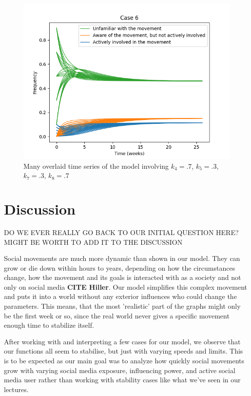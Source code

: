 \documentclass{article}
\begin{document}
    \begin{figure}[H]

        \centering
        \includegraphics[width=\textwidth]{simulation/plots/case6.png}   
        \caption{Many overlaid time series of the model involving \mbox{$k_4=.7$}, \mbox{$k_5=.3$}, \mbox{$k_7=.3$}, \mbox{$k_8=.7$}}
        \label{fig:case6}
    \end{figure}

    \section{Discussion}
    DO WE EVER REALLY GO BACK TO OUR INITIAL QUESTION HERE? MIGHT BE WORTH TO ADD IT TO THE DISCUSSION

    Social movements are much more dynamic than shown in our model. They can grow or die down within hours to years, depending on how the circumstances change, how the movement and its goals is interacted with as a society and not only on social media \textbf{CITE Hiller}. Our model simplifies this complex movement and puts it into a world without any exterior influences who could change the parameters. This means, that the most 'realistic' part of the graphs might only be the first week or so, since the real world never gives a specific movement enough time to stabilize itself.
    
    
    After working with and interpreting a few cases for our model, we observe that our functions all seem to stabilise, but just with varying speeds and limits. This is to be expected as our main goal was to analyze how quickly social movements grow with varying social media exposure, influencing power, and active social media user rather than working with stability cases like what we've seen in our lectures. 
    
\end{document}
